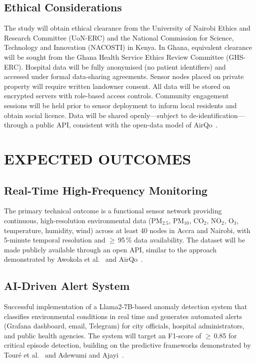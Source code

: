 \documentclass[12pt,a4paper]{report}
\begin{document}
\section{Ethical Considerations}
The study will obtain ethical clearance from the University of Nairobi Ethics and Research Committee (UoN-ERC) and the National Commission for Science, Technology and Innovation (NACOSTI) in Kenya. In Ghana, equivalent clearance will be sought from the Ghana Health Service Ethics Review Committee (GHS-ERC). Hospital data will be fully anonymised (no patient identifiers) and accessed under formal data-sharing agreements. Sensor nodes placed on private property will require written landowner consent. All data will be stored on encrypted servers with role-based access controls. Community engagement sessions will be held prior to sensor deployment to inform local residents and obtain social licence. Data will be shared openly—subject to de-identification—through a public API, consistent with the open-data model of AirQo~\cite{bainomugisha2024}.

\chapter{EXPECTED OUTCOMES}

\section{Real-Time High-Frequency Monitoring}
The primary technical outcome is a functional sensor network providing continuous, high-resolution environmental data (PM$_{2.5}$, PM$_{10}$, CO$_2$, NO$_2$, O$_3$, temperature, humidity, wind) across at least 40 nodes in Accra and Nairobi, with 5-minute temporal resolution and $\geq$\,95\,\% data availability. The dataset will be made publicly available through an open API, similar to the approach demonstrated by Awokola et al.~\cite{awokola2022} and AirQo~\cite{bainomugisha2024}.

\section{AI-Driven Alert System}
Successful implementation of a Llama2-7B-based anomaly detection system that classifies environmental conditions in real time and generates automated alerts (Grafana dashboard, email, Telegram) for city officials, hospital administrators, and public health agencies. The system will target an F1-score of $\geq$\,0.85 for critical episode detection, building on the predictive frameworks demonstrated by Touré et al.~\cite{toure2024} and Adewumi and Ajayi~\cite{adewumi2025}.
\end{document}
